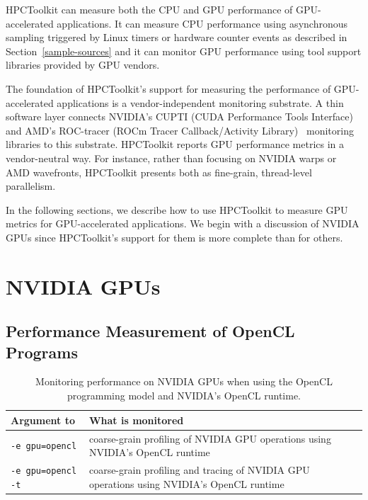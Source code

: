 HPCToolkit can measure both the CPU and GPU performance of GPU-accelerated applications. It can measure CPU performance using asynchronous sampling triggered by Linux timers or hardware counter events as described in 
Section~\ref{sample-sources} and it can monitor GPU performance using tool support libraries provided by GPU vendors.

The foundation of HPCToolkit's support for measuring the performance of GPU-accelerated applications is a vendor-independent monitoring substrate. A thin software layer connects NVIDIA's CUPTI (CUDA Performance Tools Interface)~\cite{cupti} and AMD's ROC-tracer (ROCm Tracer Callback/Activity Library)~\cite{roctracer} monitoring libraries to this substrate. HPCToolkit reports GPU performance metrics in a vendor-neutral way. For instance, rather than focusing on NVIDIA warps or AMD wavefronts, HPCToolkit presents both as fine-grain, thread-level parallelism.

In the following sections, we describe how to use HPCToolkit to measure GPU metrics for GPU-accelerated applications. We begin with a discussion of NVIDIA GPUs since HPCToolkit's support for them is more complete than for others.

\section{NVIDIA GPUs}

\subsection{Performance Measurement of OpenCL Programs}

\begin{table}[t]
\centering
\begin{tabular}{|l|p{3.5in}|}\hline
Argument to \hpcrun{} & What is monitored\\\hline\hline
{\tt -e gpu=opencl} & coarse-grain profiling of NVIDIA GPU operations using NVIDIA's OpenCL runtime\\\hline
{\tt -e gpu=opencl -t} & coarse-grain profiling and tracing of NVIDIA GPU operations using NVIDIA's OpenCL runtime\\\hline
\end{tabular}
\caption{Monitoring performance on NVIDIA GPUs when using the OpenCL programming model and  NVIDIA's OpenCL runtime.}
\label{nvidia-opencl-monitoring-options} 
\end{table}


